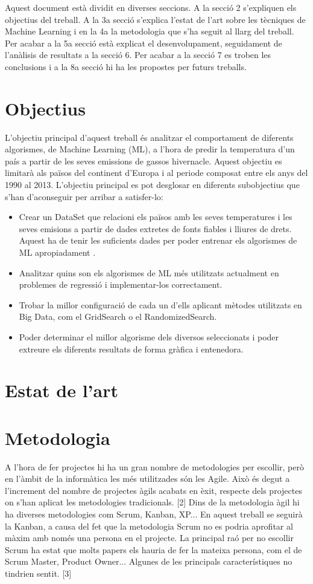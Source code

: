 \documentclass[10pt,a4paper,twocolumn,twoside]{article}
\begin{document}
Aquest document està dividit en diverses seccions. A la secció 2 s'expliquen els objectius del treball. A la 3a secció s'explica l'estat de l'art sobre les tècniques de Machine Learning i en la 4a la metodologia que s'ha seguit al llarg del treball. Per acabar a la 5a secció està explicat el desenvolupament, seguidament de l'anàlisis de resultats a la secció 6. Per acabar a la secció 7 es troben les conclusions i a la 8a secció hi ha les propostes per futurs treballs.   
\section{Objectius}
L'objectiu principal d'aquest treball és analitzar el comportament de diferents algorismes, de Machine Learning (ML), a l'hora de predir la temperatura d'un país a partir de les seves emissions de gassos hivernacle. Aquest objectiu es limitarà als països del continent d'Europa i al periode composat entre els anys del 1990 al 2013. L'objectiu principal es pot desglosar en diferents subobjectius que s'han d'aconseguir per arribar a satisfer-lo:
\begin{itemize}
\item Crear un DataSet que relacioni els països amb les seves temperatures i les seves emisions a partir de dades extretes de fonts fiables i lliures de drets. Aquest ha de tenir les suficients dades per poder entrenar els algorismes de ML apropiadament .
\item Analitzar quins son els algorismes de ML més utilitzats actualment en problemes de regressió i implementar-los correctament.
\item Trobar la millor configuració de cada un d'ells aplicant mètodes utilitzats en Big Data, com el GridSearch o el RandomizedSearch.
\item Poder determinar el millor algorisme dels diversos seleccionats i poder extreure els diferents resultats de forma gràfica i entenedora.     
\end{itemize}
\section {Estat de l'art}

\section {Metodologia}
A l'hora de fer projectes hi ha un gran nombre de metodologies per escollir, però en l'àmbit de la informàtica les més utilitzades són les Agile. Això és degut a l'increment del nombre de projectes àgils acabats en èxit, respecte dels projectes on s'han aplicat les metodologies tradicionals. [2] Dins de la metodologia àgil hi ha diverses metodologies com Scrum, Kanban, XP... En aquest treball se seguirà la Kanban, a causa del fet que la metodologia Scrum no es podria aprofitar al màxim amb només una persona en el projecte. La principal raó per no escollir Scrum ha estat que molts papers els hauria de fer la mateixa persona, com el de Scrum Master, Product Owner... Algunes de les principals característiques no tindrien sentit. [3]
\end{document}
